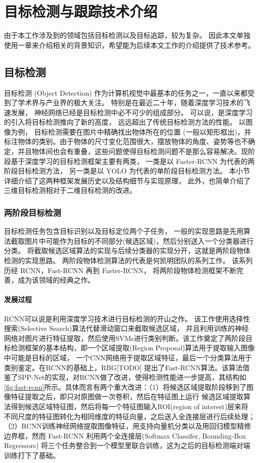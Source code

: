 \chapter{目标检测与跟踪技术介绍}
\label{technologies}
由于本工作涉及到的领域包括目标检测以及目标追踪，较为复杂。 因此本文单独使用一章来介绍相关的背景知识，希望能为后续本文工作的介绍提供了技术参考。

\section{目标检测}
\label{object_detection}
目标检测 (Object Detection) 作为计算机视觉中最基本的任务之一，一直以来都受到了学术界与产业界的极大关注。 特别是在最近二十年，随着深度学习技术的飞速发展， 神经网络已经是目标检测中必不可少的组成部分。 可以说，是深度学习的引入将目标检测推向了新的高度， 远远超出了传统目标检测方法的性能。 以图像为例， 目标检测需要在图片中精确找出物体所在的位置 (一般以矩形框出)，并标注物体的类别。由于物体的尺寸变化范围很大，摆放物体的角度、姿势等也不确定，并且物体间也会有重叠，这些问题使得目标检测问题不是那么容易解决。现阶段基于深度学习的目标检测框架主要有两类， 一类是以 Faster-RCNN 为代表的两阶段目标检测方法， 另一类是以 YOLO 为代表的单阶段目标检测方法。 本小节详细介绍了这两种框架发展历史以及结构细节与实现原理， 此外，也简单介绍了三维目标检测相对于二维目标检测的改进。

\subsection{两阶段目标检测}
\label{two-stage}
目标检测任务包含目标识别以及目标定位两个子任务， 一般的实现思路是先用算法截取图片中可能作为目标的不同部分(候选区域)，然后分别送入一个分类器进行分类。 将截取候选区域算法的实现与后续分类器的实现分开，这就是两阶段物体检测的实现思路。 两阶段物体检测算法的代表是何凯明团队的系列工作。 该系列历经 RCNN，Fast-RCNN 再到 Faster-RCNN， 将两阶段物体检测框架不断完善，成为该领域的经典之作。 

\subsubsection{发展过程}
RCNN可以说是利用深度学习技术进行目标检测的开山之作。 该工作使用选择性搜索(Selective Search)算法代替滑动窗口来截取候选区域， 并且利用训练的神经网络对图片进行特征提取，然后使用SVMs进行类别判断。该工作奠定了两阶段目标检测框架的基本结构，即一个区域提取(Region Proposal)算法用于提取输入图像中可能是目标的区域， 一个CNN网络用于提取区域特征，最后一个分类算法用于类别鉴定。在RCNN的基础上，RBG[TODO] 提出了Fast-RCNN算法。该算法借鉴了SPP-Net的实现，对RCNN做了改进，使得检测性能进一步提高，其结构如 \figurename \, \ref{fig:fast-rcnn}所示。具体而言有两个重大改进：（1）将候选区域提取阶段移到了图像特征提取之后，即只对原图做一次卷积，然后在特征图上运行 候选区域提取算法得到候选区域特征图，然后将每一个特征图输入ROI(region of interest)层来将不同尺度的特征图转化为相同维度的特征向量，之后送入全连接层进行后续处理；（2）RCNN训练神经网络提取图像特征，用支持向量机分类以及用回归模型精修边界框，然而 Fast-RCNN 利用两个全连接层(Softmax Classifer, Bounding-Box Regressors) 将三个任务整合到一个模型里联合训练，这为之后的目标检测端对端训练打下了基础。

